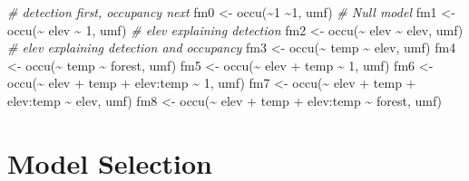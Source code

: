 \documentclass[
]{book}
\newenvironment{Shaded}{\begin{snugshade}}{\end{snugshade}}
\newcommand{\CommentTok}[1]{\textcolor[rgb]{0.56,0.35,0.01}{\textit{#1}}}
\newcommand{\DecValTok}[1]{\textcolor[rgb]{0.00,0.00,0.81}{#1}}
\newcommand{\FunctionTok}[1]{\textcolor[rgb]{0.00,0.00,0.00}{#1}}
\newcommand{\NormalTok}[1]{#1}
\newcommand{\OtherTok}[1]{\textcolor[rgb]{0.56,0.35,0.01}{#1}}
\newcommand{\SpecialCharTok}[1]{\textcolor[rgb]{0.00,0.00,0.00}{#1}}
\begin{document}
\begin{Shaded}
\begin{Highlighting}[]
\CommentTok{\# detection first, occupancy next}
\NormalTok{fm0 }\OtherTok{\textless{}{-}} \FunctionTok{occu}\NormalTok{(}\SpecialCharTok{\textasciitilde{}}\DecValTok{1} \SpecialCharTok{\textasciitilde{}}\DecValTok{1}\NormalTok{, umf) }\CommentTok{\# Null model}
\NormalTok{fm1 }\OtherTok{\textless{}{-}} \FunctionTok{occu}\NormalTok{(}\SpecialCharTok{\textasciitilde{}}\NormalTok{ elev }\SpecialCharTok{\textasciitilde{}} \DecValTok{1}\NormalTok{, umf) }\CommentTok{\# elev explaining detection}
\NormalTok{fm2 }\OtherTok{\textless{}{-}} \FunctionTok{occu}\NormalTok{(}\SpecialCharTok{\textasciitilde{}}\NormalTok{ elev }\SpecialCharTok{\textasciitilde{}}\NormalTok{ elev, umf) }\CommentTok{\# elev explaining detection and occupancy}
\NormalTok{fm3 }\OtherTok{\textless{}{-}} \FunctionTok{occu}\NormalTok{(}\SpecialCharTok{\textasciitilde{}}\NormalTok{ temp }\SpecialCharTok{\textasciitilde{}}\NormalTok{ elev, umf)}
\NormalTok{fm4 }\OtherTok{\textless{}{-}} \FunctionTok{occu}\NormalTok{(}\SpecialCharTok{\textasciitilde{}}\NormalTok{ temp }\SpecialCharTok{\textasciitilde{}}\NormalTok{ forest, umf)}
\NormalTok{fm5 }\OtherTok{\textless{}{-}} \FunctionTok{occu}\NormalTok{(}\SpecialCharTok{\textasciitilde{}}\NormalTok{ elev }\SpecialCharTok{+}\NormalTok{ temp }\SpecialCharTok{\textasciitilde{}} \DecValTok{1}\NormalTok{, umf)}
\NormalTok{fm6 }\OtherTok{\textless{}{-}} \FunctionTok{occu}\NormalTok{(}\SpecialCharTok{\textasciitilde{}}\NormalTok{ elev }\SpecialCharTok{+}\NormalTok{ temp }\SpecialCharTok{+}\NormalTok{ elev}\SpecialCharTok{:}\NormalTok{temp }\SpecialCharTok{\textasciitilde{}} \DecValTok{1}\NormalTok{, umf)}
\NormalTok{fm7 }\OtherTok{\textless{}{-}} \FunctionTok{occu}\NormalTok{(}\SpecialCharTok{\textasciitilde{}}\NormalTok{ elev }\SpecialCharTok{+}\NormalTok{ temp }\SpecialCharTok{+}\NormalTok{ elev}\SpecialCharTok{:}\NormalTok{temp }\SpecialCharTok{\textasciitilde{}}\NormalTok{ elev, umf)}
\NormalTok{fm8 }\OtherTok{\textless{}{-}} \FunctionTok{occu}\NormalTok{(}\SpecialCharTok{\textasciitilde{}}\NormalTok{ elev }\SpecialCharTok{+}\NormalTok{ temp }\SpecialCharTok{+}\NormalTok{ elev}\SpecialCharTok{:}\NormalTok{temp }\SpecialCharTok{\textasciitilde{}}\NormalTok{ forest, umf)}
\end{Highlighting}
\end{Shaded}

\hypertarget{model-selection}{%
\section{Model Selection}\label{model-selection}}
\end{document}
